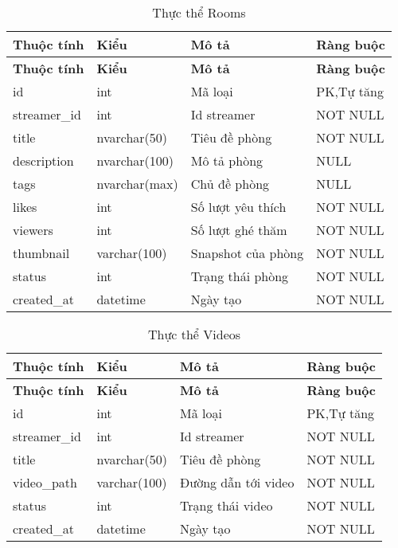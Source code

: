 \begin{center}
\begin{longtabu} to 
\caption{Thực thể Rooms} \\
   \hline \textbf{Thuộc tính}  & \textbf{Kiểu} & \textbf{Mô tả} & \textbf{Ràng buộc} \\ \hline
   \endfirsthead
   \hline \textbf{Thuộc tính}  & \textbf{Kiểu} & \textbf{Mô tả} & \textbf{Ràng buộc} \\ \hline
   \endhead
      id & int  & Mã loại & PK,Tự tăng
      \\ \hline
      streamer\_id & int & Id streamer & NOT NULL 
      \\ \hline
      title & nvarchar(50) & Tiêu đề phòng & NOT NULL
      \\ \hline
      description & nvarchar(100) & Mô tả phòng & NULL
      \\ \hline
      tags & nvarchar(max) & Chủ đề phòng & NULL
      \\ \hline
      likes & int & Số lượt yêu thích & NOT NULL
      \\ \hline
      viewers & int & Số lượt ghé thăm & NOT NULL
      \\ \hline
      thumbnail & varchar(100) & Snapshot của phòng & NOT NULL
      \\ \hline
      status & int & Trạng thái phòng & NOT NULL
      \\ \hline
      created\_at & datetime & Ngày tạo & NOT NULL
      \\ \hline
\end{longtabu}
\end{center}

\begin{center}
\begin{longtabu} to 
\caption{Thực thể Videos} \\
   \hline \textbf{Thuộc tính}  & \textbf{Kiểu} & \textbf{Mô tả} & \textbf{Ràng buộc} \\ \hline
   \endfirsthead
   \hline \textbf{Thuộc tính}  & \textbf{Kiểu} & \textbf{Mô tả} & \textbf{Ràng buộc} \\ \hline
   \endhead
      id & int  & Mã loại & PK,Tự tăng
      \\ \hline
      streamer\_id & int & Id streamer & NOT NULL 
      \\ \hline
      title & nvarchar(50) & Tiêu đề phòng & NOT NULL
      \\ \hline
      video\_path & varchar(100) & Đường dẫn tới video & NOT NULL
      \\ \hline
      status & int & Trạng thái video & NOT NULL
      \\ \hline
      created\_at & datetime & Ngày tạo & NOT NULL
      \\ \hline
\end{longtabu}
\end{center}

